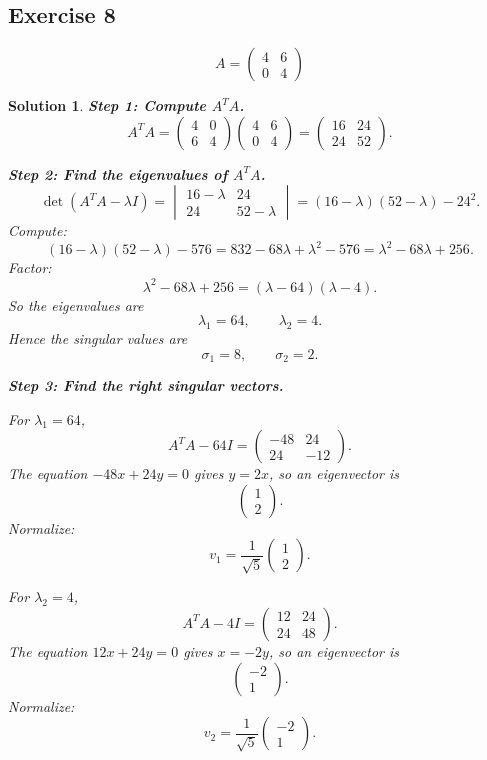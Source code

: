 \documentclass[11pt,a4paper]{article}
\theoremstyle{sol}
\newtheorem*{solution}{Solution}
\begin{document}
\clearpage
\subsection*{Exercise 8}
\[
A=\begin{pmatrix}4&6\\0&4\end{pmatrix}
\]

\begin{solution}
\textbf{Step 1: Compute $A^TA$.}
\[
A^TA=
\begin{pmatrix}4&0\\6&4\end{pmatrix}
\begin{pmatrix}4&6\\0&4\end{pmatrix}
=
\begin{pmatrix}
16&24\\
24&52
\end{pmatrix}.
\]

\textbf{Step 2: Find the eigenvalues of $A^TA$.}
\[
\det(A^TA-\lambda I)
=
\begin{vmatrix}
16-\lambda&24\\
24&52-\lambda
\end{vmatrix}
=(16-\lambda)(52-\lambda)-24^2.
\]
Compute:
\[
(16-\lambda)(52-\lambda)-576
=832-68\lambda+\lambda^2-576
=\lambda^2-68\lambda+256.
\]
Factor:
\[
\lambda^2-68\lambda+256=(\lambda-64)(\lambda-4).
\]
So the eigenvalues are
\[
\lambda_1=64,\qquad \lambda_2=4.
\]
Hence the singular values are
\[
\sigma_1=8,\qquad \sigma_2=2.
\]

\textbf{Step 3: Find the right singular vectors.}

For $\lambda_1=64$,
\[
A^TA-64I=
\begin{pmatrix}
-48&24\\
24&-12
\end{pmatrix}.
\]
The equation $-48x+24y=0$ gives $y=2x$, so an eigenvector is
\[
\begin{pmatrix}1\\2\end{pmatrix}.
\]
Normalize:
\[
v_1=\frac{1}{\sqrt5}\begin{pmatrix}1\\2\end{pmatrix}.
\]

For $\lambda_2=4$,
\[
A^TA-4I=
\begin{pmatrix}
12&24\\
24&48
\end{pmatrix}.
\]
The equation $12x+24y=0$ gives $x=-2y$, so an eigenvector is
\[
\begin{pmatrix}-2\\1\end{pmatrix}.
\]
Normalize:
\[
v_2=\frac{1}{\sqrt5}\begin{pmatrix}-2\\1\end{pmatrix}.
\]


\end{solution}
\end{document}
